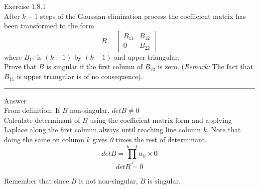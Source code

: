 \documentclass[12pt]{article}
\begin{document}
Exercise $1.8.1$\\


After $k - 1$ steps of the Gaussian elimination process the coefficient matrix has been transformed to the form
$$
B = 
\begin{bmatrix}
	B_{11}	& B_{12}\\
	0		& B_{22}
\end{bmatrix}
$$
where $B_{11}$ is $(k - 1)$ by $(k-1)$ and upper triangular.\\

Prove that $B$ is singular if the first column of $B_{22}$ is zero. (\textit{Remark:} The fact that $B_{11}$ is upper triangular is of no consequence). \\

\noindent\rule{\textwidth}{1pt}

Answer\\

From definition: If $B$ non-singular, $det B \neq 0$\\

Calculate determinant of $B$ using the coefficient matrix form and applying Laplace along the first column always until reaching line column $k$. Note that doing the same on column $k$ gives \textit{0} times the rest of determinant.
$$
det B = \prod_i^{k-1}a_{ii}\times0
$$
$$
det B = 0
$$ 

Remember that since $B$ is not non-singular, $B$ is singular.
\end{document}

